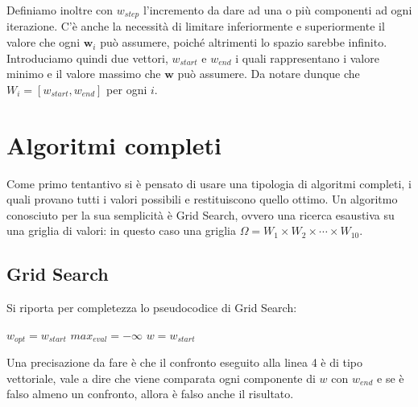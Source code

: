 Definiamo inoltre con $w_{step}$ l'incremento da dare ad una o più
componenti ad ogni iterazione.
C'è anche la necessità di limitare inferiormente e superiormente
il valore che ogni $\boldsymbol{w}_i$ può assumere,
poiché altrimenti lo spazio sarebbe infinito. 
Introduciamo quindi
due vettori, $w_{start}$ e $w_{end}$ i quali rappresentano
i valore minimo e il valore massimo che $\boldsymbol{w}$
può assumere. Da notare dunque che $W_i = \left[w_{start}, w_{end}\right]$
per ogni $i$.

\section{Algoritmi completi}
Come primo tentantivo si è pensato di usare una tipologia di algoritmi completi,
i quali provano tutti i valori possibili e restituiscono quello ottimo. Un algoritmo
conosciuto per la sua semplicità è Grid Search, ovvero una ricerca esaustiva
su una griglia di valori: in questo caso una griglia $\Omega = W_1 \times W_2 \times \cdots \times W_{10}$.

\subsection{Grid Search}

Si riporta per completezza lo pseudocodice di Grid Search:

\begin{algorithm}[h]
	\small
	\DontPrintSemicolon
	\BlankLine
	$w_{opt} = w_{start}$\;
	$max_{eval} = -\infty$\;
	$w = w_{start}$\;
	\BlankLine
	\caption{\textsc{}}
	\label{alg:gss}
\end{algorithm}

Una precisazione da fare è che il confronto
eseguito alla linea 4 è di tipo vettoriale, vale a dire che
viene comparata ogni componente di $w$ con $w_{end}$ e se
è falso almeno un confronto, allora è falso anche il risultato.

